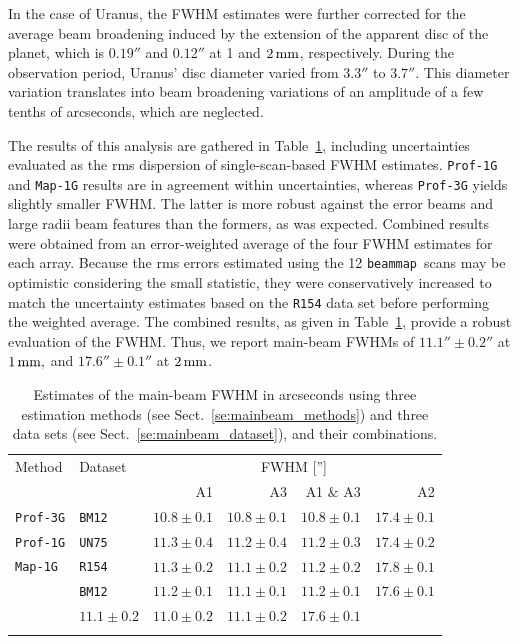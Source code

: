 \documentclass[traditionalabstract]{aa}
\newcommand{\bm}{{\tt beammap}}
\newcommand{\lp}[1]{#1}
\begin{document}
{In the case of Uranus, the FWHM estimates were further corrected for
the {\lp average beam broadening induced by the extension of the
apparent disc of the planet, which is $0.19''$ and $0.12''$ at 1 and
$2\,\rm{mm}$, respectively.}
{\lp During the observation period, Uranus' disc diameter varied
from $3.3''$ to $3.7''$. This diameter variation translates into beam
broadening variations of an amplitude of a few tenths of arcseconds,
which are neglected.}  

The results of this analysis are
gathered in Table~\ref{tab:fwhm}, including uncertainties evaluated as
the rms dispersion of single-scan-based FWHM estimates.
{\tt Prof-1G} and {\tt Map-1G} results are in agreement within
uncertainties, whereas {\tt Prof-3G} yields slightly smaller FWHM.
{\lp The latter is more robust against the error beams and large radii
beam features than the formers, as was expected.}
Combined results were obtained from an error-weighted
average of the four FWHM estimates for each array.
Because the rms errors estimated using the 12 \bm\ scans may be
optimistic considering the small statistic, they were conservatively
increased to match the uncertainty estimates based on the {\tt R154}
data set before performing the weighted average.  
The combined results, as given in
Table~\ref{tab:fwhm}, provide a robust evaluation of the
FWHM. Thus, we report main-beam FWHMs of $11.1'' \pm 0.2''$ at
$1\, \rm{mm,}$ and $17.6''\pm 0.1''$ at $2\, \rm{mm}$.  

\begin{table}[!thbp]
  \caption[]{Estimates of the main-beam FWHM in arcseconds using three estimation methods (see
    Sect.~\ref{se:mainbeam_methods}) and three data sets
    (see Sect.~\ref{se:mainbeam_dataset}), and their combinations.}
  \label{tab:fwhm}
  \centering
  \begin{tabular}{llrrrr}
    \hline\hline
    \noalign{\smallskip}
    Method   &    Dataset   &  \multicolumn{4}{c}{FWHM ['']} \\
    \noalign{\smallskip}\cline{3-6}\noalign{\smallskip}
        &    &   A1 &  A3 & A1 $\&$ A3 &  A2  \\
    \noalign{\smallskip}
    \hline
    \noalign{\smallskip}
    {\tt Prof-3G}  &  {\tt BM12}    & $10.8 \pm 0.1$  &  $10.8 \pm 0.1$  & $10.8 \pm 0.1$  &  $17.4 \pm 0.1$  \\
    {\tt Prof-1G}  &  {\tt UN75}    & $11.3 \pm 0.4$  &  $11.2 \pm 0.4$  & $11.2 \pm 0.3$   & $17.4 \pm 0.2$  \\ 
    {\tt Map-1G}   &  {\tt R154}    & $11.3 \pm 0.2$  &  $11.1 \pm 0.2$  & $11.2 \pm 0.2$  &  $17.8 \pm 0.1$  \\ 
                   &  {\tt BM12}    & $11.2 \pm 0.1$  &  $11.1 \pm 0.1$  & $11.2 \pm 0.1$  &  $17.6 \pm 0.1$  \\
    \noalign{\smallskip}
    \hline
    \noalign{\smallskip}
    \multicolumn{2}{c}{Combined}               & $11.1 \pm 0.2$  & $11.0 \pm 0.2$  & $11.1 \pm 0.2$  &  $17.6 \pm 0.1$  \\
    \noalign{\smallskip}
    \hline
  \end{tabular}
\end{table}

}
\end{document}
